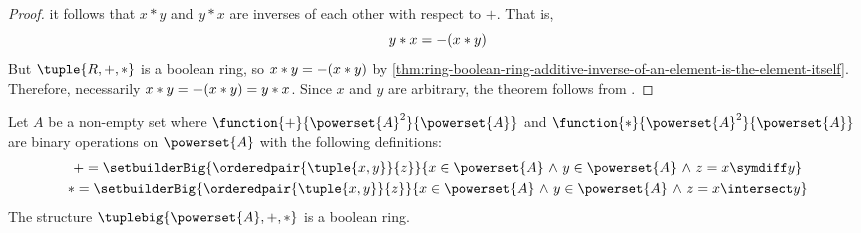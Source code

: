 \begin{proof}
    it follows that \( x \ast y \) and \( y \ast x \) are inverses of each other with respect to \( + \).
    That is,
    \begin{equation*}
        y \ast x = - \mleft( x \ast y \mright)
    \end{equation*}
    But \( \tuple{R,+,\ast} \) is a boolean ring, so
    \( x \ast y = - \mleft( x \ast y \mright) \) by \cref{thm:ring-boolean-ring-additive-inverse-of-an-element-is-the-element-itself}.
    Therefore, necessarily \( x \ast y = - \mleft( x \ast y \mright) = y \ast x \). Since \( x \) and \( y \) are arbitrary, the theorem
    follows from .
\end{proof}

\begin{thm}
    \label{thm:ring-power-set-of-a-set-forms-a-boolean-ring}
    Let \( A \) be a non-empty set where \( \function{+}{\powerset{A}^{2}}{\powerset{A}} \)
    and \( \function{\ast}{\powerset{A}^{2}}{\powerset{A}} \) are binary operations on \( \powerset{A} \)
    with the following definitions:
    \begin{gather*}
        +
        =
        \setbuilderBig{\orderedpair{\tuple{x,y}}{z}}{x \in \powerset{A} \,\,{\land}\,\, y \in \powerset{A} \,\,{\land}\,\, z = x \symdiff y }\\
        \ast
        =
        \setbuilderBig{\orderedpair{\tuple{x,y}}{z}}{x \in \powerset{A} \,\,{\land}\,\, y \in \powerset{A} \,\,{\land}\,\, z = x \intersect y }
    \end{gather*}
    The structure \( \tuplebig{\powerset{A},+,\ast} \) is a boolean ring.
\end{thm}

